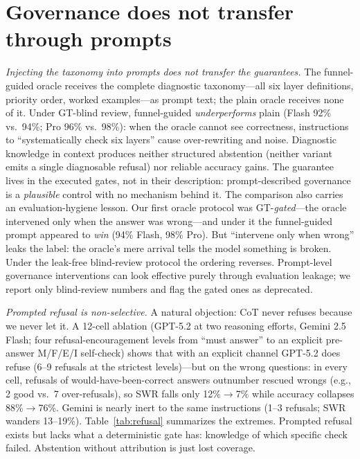\section{Governance does not transfer through prompts}\label{app:prompts}
\emph{Injecting the taxonomy into prompts does not transfer the guarantees.}
The funnel-guided oracle receives the complete diagnostic taxonomy---all six layer definitions, priority order, worked examples---as prompt text; the plain oracle receives none of it.
Under GT-blind review, funnel-guided \emph{underperforms} plain (Flash 92\% vs.\ 94\%; Pro 96\% vs.\ 98\%): when the oracle cannot see correctness, instructions to ``systematically check six layers'' cause over-rewriting and noise.
Diagnostic knowledge in context produces neither structured abstention (neither variant emits a single diagnosable refusal) nor reliable accuracy gains.
The guarantee lives in the executed gates, not in their description: prompt-described governance is a \emph{plausible} control with no mechanism behind it.
The comparison also carries an evaluation-hygiene lesson.
Our first oracle protocol was GT-\emph{gated}---the oracle intervened only when the answer was wrong---and under it the funnel-guided prompt appeared to \emph{win} (94\% Flash, 98\% Pro).
But ``intervene only when wrong'' leaks the label: the oracle's mere arrival tells the model something is broken.
Under the leak-free blind-review protocol the ordering reverses.
Prompt-level governance interventions can look effective purely through evaluation leakage; we report only blind-review numbers and flag the gated ones as deprecated.

\emph{Prompted refusal is non-selective.}
A natural objection: CoT never refuses because we never let it.
A 12-cell ablation (GPT-5.2 at two reasoning efforts, Gemini 2.5 Flash; four refusal-encouragement levels from ``must answer'' to an explicit pre-answer M/F/E/I self-check) shows that with an explicit channel GPT-5.2 does refuse (6--9 refusals at the strictest levels)---but on the wrong questions: in every cell, refusals of would-have-been-correct answers outnumber rescued wrongs (e.g., 2 good vs.\ 7 over-refusals), so SWR falls only 12\%$\rightarrow$7\% while accuracy collapses 88\%$\rightarrow$76\%.
Gemini is nearly inert to the same instructions (1--3 refusals; SWR wanders 13--19\%).
Table~\ref{tab:refusal} summarizes the extremes.
Prompted refusal exists but lacks what a deterministic gate has: knowledge of which specific check failed.
Abstention without attribution is just lost coverage.

